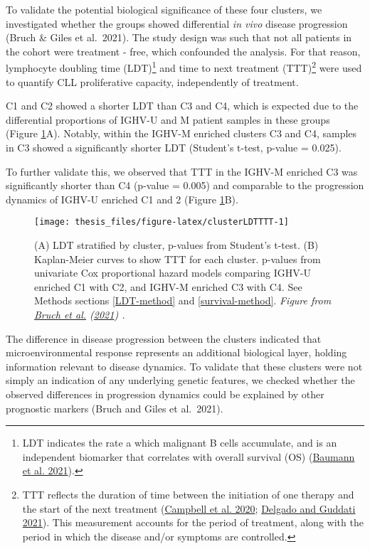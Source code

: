\documentclass[11pt, a4paper, twosided]{book}
\begin{document}
To validate the potential biological significance of these four clusters, we investigated whether the groups showed differential \emph{in vivo} disease progression (Bruch \& Giles et al.~2021). The study design was such that not all patients in the cohort were treatment - free, which confounded the analysis. For that reason, lymphocyte doubling time (LDT)\footnote{LDT indicates the rate a which malignant B cells accumulate, and is an independent biomarker that correlates with overall survival (OS) (\protect\hyperlink{ref-Baumann2021}{Baumann et al. 2021}).} and time to next treatment (TTT)\footnote{TTT reflects the duration of time between the initiation of one therapy and the start of the next treatment (\protect\hyperlink{ref-Campbell2020}{Campbell et al. 2020}; \protect\hyperlink{ref-Delgado2021}{Delgado and Guddati 2021}). This measurement accounts for the period of treatment, along with the period in which the disease and/or symptoms are controlled.} were used to quantify CLL proliferative capacity, independently of treatment.

C1 and C2 showed a shorter LDT than C3 and C4, which is expected due to the differential proportions of IGHV-U and M patient samples in these groups (Figure \ref{fig:clusterLDTTTT}A). Notably, within the IGHV-M enriched clusters C3 and C4, samples in C3 showed a significantly shorter LDT (Student's t-test, p-value = 0.025).

To further validate this, we observed that TTT in the IGHV-M enriched C3 was significantly shorter than C4 (p-value = 0.005) and comparable to the progression dynamics of IGHV-U enriched C1 and 2 (Figure \ref{fig:clusterLDTTTT}B).


\begin{figure}

{\centering \texttt{[image: thesis\_files/figure-latex/clusterLDTTTT-1]} 

}

\caption{(A) LDT stratified by cluster, p-values from Student's t-test. (B) Kaplan-Meier curves to show TTT for each cluster. p-values from univariate Cox proportional hazard models comparing IGHV-U enriched C1 with C2, and IGHV-M enriched C3 with C4. See Methods sections \ref{LDT-method} and \ref{survival-method}. \emph{Figure from \protect\hyperlink{ref-Giles2021}{Bruch et al.} (\protect\hyperlink{ref-Giles2021}{2021}) .}}\label{fig:clusterLDTTTT}
\end{figure}
The difference in disease progression between the clusters indicated that microenvironmental response represents an additional biological layer, holding information relevant to disease dynamics. To validate that these clusters were not simply an indication of any underlying genetic features, we checked whether the observed differences in progression dynamics could be explained by other prognostic markers (Bruch and Giles et al.~2021).
\end{document}
